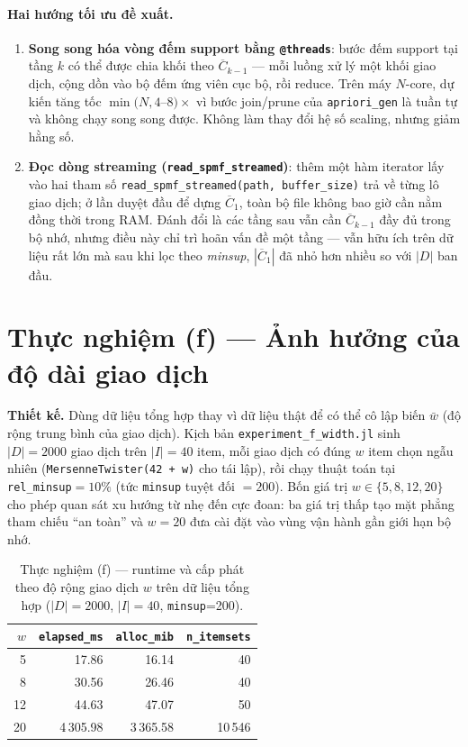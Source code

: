 \paragraph{Hai hướng tối ưu đề xuất.}
\begin{enumerate}
    \item \textbf{Song song hóa vòng đếm support bằng \texttt{@threads}}: bước đếm support tại tầng $k$ có thể được chia khối theo $\overline{C}_{k-1}$ --- mỗi luồng xử lý một khối giao dịch, cộng dồn vào bộ đếm ứng viên cục bộ, rồi reduce. Trên máy $N$-core, dự kiến tăng tốc $\min(N, 4$--$8)\times$ vì bước join/prune của \texttt{apriori\_gen} là tuần tự và không chạy song song được. Không làm thay đổi hệ số scaling, nhưng giảm hằng số.
    \item \textbf{Đọc dòng streaming (\texttt{read\_spmf\_streamed})}: thêm một hàm iterator lấy vào hai tham số \texttt{read\_spmf\_streamed(path, buffer\_size)} trả về từng lô giao dịch; ở lần duyệt đầu để dựng $\overline{C}_1$, toàn bộ file không bao giờ cần nằm đồng thời trong RAM. Đánh đổi là các tầng sau vẫn cần $\overline{C}_{k-1}$ đầy đủ trong bộ nhớ, nhưng điều này chỉ trì hoãn vấn đề một tầng --- vẫn hữu ích trên dữ liệu rất lớn mà sau khi lọc theo \textit{minsup}, $|\overline{C}_1|$ đã nhỏ hơn nhiều so với $|D|$ ban đầu.
\end{enumerate}

\section{Thực nghiệm (f) --- Ảnh hưởng của độ dài giao dịch}
\label{sec:exp-f}

\textbf{Thiết kế.} Dùng dữ liệu tổng hợp thay vì dữ liệu thật để có thể cô lập biến $\bar{w}$ (độ rộng trung bình của giao dịch). Kịch bản \texttt{experiment\_f\_width.jl} sinh $|D|=2000$ giao dịch trên $|I|=40$ item, mỗi giao dịch có đúng $w$ item chọn ngẫu nhiên (\texttt{MersenneTwister(42 + w)} cho tái lập), rồi chạy thuật toán tại \texttt{rel\_minsup}$= 10\%$ (tức \texttt{minsup} tuyệt đối $= 200$). Bốn giá trị $w \in \{5, 8, 12, 20\}$ cho phép quan sát xu hướng từ nhẹ đến cực đoan: ba giá trị thấp tạo mặt phẳng tham chiếu ``an toàn'' và $w=20$ đưa cài đặt vào vùng vận hành gần giới hạn bộ nhớ.

\begin{table}[htbp]
    \centering
    \caption{Thực nghiệm (f) --- runtime và cấp phát theo độ rộng giao dịch $w$ trên dữ liệu tổng hợp ($|D|=2000$, $|I|=40$, \texttt{minsup}=200).}
    \label{tab:exp-f}
    \begin{tabular}{r|r|r|r}
        \hline
        $w$ & \texttt{elapsed\_ms} & \texttt{alloc\_mib} & \texttt{n\_itemsets} \\ \hline
        5   & 17.86     & 16.14     & 40 \\
        8   & 30.56     & 26.46     & 40 \\
        12  & 44.63     & 47.07     & 50 \\
        20  & 4\,305.98 & 3\,365.58 & 10\,546 \\
        \hline
    \end{tabular}
\end{table}

